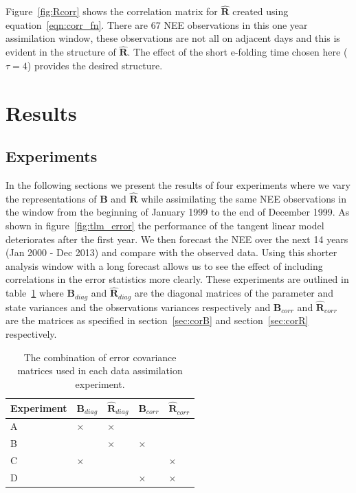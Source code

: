 \documentclass[review]{elsarticle}
\begin{document}
Figure~\ref{fig:Rcorr} shows the correlation matrix for $\hat{\mathbf{R}}$ created using equation~\eqref{eqn:corr_fn}. There are 67 NEE observations in this one year assimilation window, these observations are not all on adjacent days and this is evident in the structure of $\hat{\mathbf{R}}$. The effect of the short e-folding time chosen here ($\tau=4$) provides the desired structure. 

\section{Results} \label{sec:results}

\subsection{Experiments} \label{sec:exps}

In the following sections we present the results of four experiments where we vary the representations of $\textbf{B}$ and $\hat{\mathbf{R}}$ while assimilating the same NEE observations in the window from the beginning of January 1999 to the end of December 1999. As shown in figure~\ref{fig:tlm_error} the performance of the tangent linear model deteriorates after the first year. We then forecast the NEE over the next 14 years (Jan 2000 - Dec 2013) and compare with the observed data. Using this shorter analysis window with a long forecast allows us to see the effect of including correlations in the error statistics more clearly. These experiments are outlined in table~\ref{table:exps_tab} where $\textbf{B}_{diag}$ and $\hat{\mathbf{R}}_{diag}$ are the diagonal matrices of the parameter and state variances and the observations variances respectively and $\textbf{B}_{corr}$ and $\hat{\mathbf{R}}_{corr}$ are the matrices as specified in section~\ref{sec:corB} and section~\ref{sec:corR} respectively.

\begin{table}[ht] 
\begin{center}
	\begin{tabular}{| l | l | l | l | l |}
	\hline
	Experiment & $\textbf{B}_{diag}$ & $\hat{\mathbf{R}}_{diag}$ & $\textbf{B}_{corr}$ &
	$\hat{\mathbf{R}}_{corr}$ \\ \hline
	A & $\times$ & $\times$ & & \\ \hline
	B & & $\times$ & $\times$ & \\ \hline
	C & $\times$ & & & $\times$ \\ \hline
	D & & & $\times$ & $\times$ \\ 
	\hline
	\end{tabular}
	\caption{The combination of error covariance matrices used in each data assimilation experiment.}
	\label{table:exps_tab}
\end{center} 
\end{table}
\end{document}
